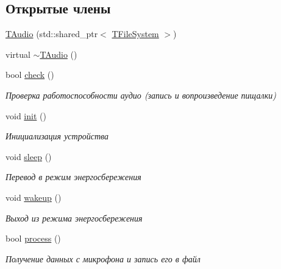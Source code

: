 \subsection*{Открытые члены}
\begin{DoxyCompactItemize}
\item 
\hyperlink{classunit_1_1_t_audio_a326d9d807df56ef1a264564c69c350b5}{T\+Audio} (std\+::shared\+\_\+ptr$<$ \hyperlink{classunit_1_1_t_file_system}{T\+File\+System} $>$)
\item 
virtual \hyperlink{classunit_1_1_t_audio_ab62b7453a3128fd1ab9d2473237ba331}{$\sim$\+T\+Audio} ()
\item 
\mbox{\label{classunit_1_1_t_audio_a69cc926edc98c59e9ffaad10ceb605f0}} 
bool \hyperlink{classunit_1_1_t_audio_a69cc926edc98c59e9ffaad10ceb605f0}{check} ()
\begin{DoxyCompactList}\small\item\em Проверка работоспособности аудио (запись и вопроизведение пищалки) \end{DoxyCompactList}\item 
\mbox{\label{classunit_1_1_t_audio_a362d211c87c2497e12792243cc2c0fc9}} 
void \hyperlink{classunit_1_1_t_audio_a362d211c87c2497e12792243cc2c0fc9}{init} ()
\begin{DoxyCompactList}\small\item\em Инициализация устройства \end{DoxyCompactList}\item 
\mbox{\label{classunit_1_1_t_audio_aab519e5239080d5ef906293dedc9399a}} 
void \hyperlink{classunit_1_1_t_audio_aab519e5239080d5ef906293dedc9399a}{sleep} ()
\begin{DoxyCompactList}\small\item\em Перевод в режим энергосбережения \end{DoxyCompactList}\item 
\mbox{\label{classunit_1_1_t_audio_a3cbc7de5ae0d03af42eeed896829d85c}} 
void \hyperlink{classunit_1_1_t_audio_a3cbc7de5ae0d03af42eeed896829d85c}{wakeup} ()
\begin{DoxyCompactList}\small\item\em Выход из режима энергосбережения \end{DoxyCompactList}\item 
bool \hyperlink{classunit_1_1_t_audio_ad547ef4d28534b9cd76d2e7eb539d1e0}{process} ()
\begin{DoxyCompactList}\small\item\em Получение данных с микрофона и запись его в файл \end{DoxyCompactList}\end{DoxyCompactItemize}


